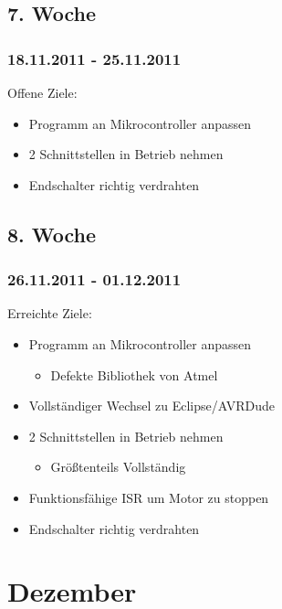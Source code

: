 \documentclass[ngerman]{beamer}
\begin{document}
\subsection{7. Woche}
\begin{frame}\frametitle{18.11.2011 - 25.11.2011}
Offene Ziele: 
\begin{itemize}
\item Programm an Mikrocontroller anpassen 
\item 2 Schnittstellen in Betrieb nehmen 
\item Endschalter richtig verdrahten
\end{itemize}
\end{frame}
\subsection{8. Woche}
\begin{frame}\frametitle{26.11.2011 - 01.12.2011}
Erreichte Ziele: 
\begin{itemize}
\item Programm an Mikrocontroller anpassen 

\begin{itemize}
\item Defekte Bibliothek von Atmel 
\end{itemize}
\item Vollständiger Wechsel zu Eclipse/AVRDude 
\item 2 Schnittstellen in Betrieb nehmen 

\begin{itemize}
\item Größtenteils Vollständig 
\end{itemize}
\item Funktionsfähige ISR um Motor zu stoppen 
\item Endschalter richtig verdrahten
\end{itemize}
\end{frame}
\section{Dezember}
\end{document}
